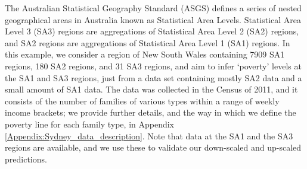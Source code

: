 \documentclass[nojss]{jss}
\begin{document}



The Australian Statistical Geography Standard (ASGS) defines a series of nested geographical areas in Australia known as Statistical Area Levels. 
Statistical Area Level 3 (SA3) regions are aggregations of Statistical Area Level 2 (SA2) regions, and SA2 regions are aggregations of  Statistical Area Level 1 (SA1) regions. 
In this example, we consider a region of New South Wales containing 7909 SA1 regions, 180 SA2 regions, and 31 SA3 regions, and aim to infer `poverty' levels at the SA1 and SA3 regions, 
just from a data set containing mostly SA2 data and a small amount of SA1 data. 
The data was collected in the Census of 2011, and it consists of the number of families of various types within a range of weekly income brackets; we provide further details, and the way in which we define the poverty line for each family type, in Appendix \ref{Appendix:Sydney_data_description}. 
Note that data at the SA1 and the SA3 regions are available, and we use these to validate our down-scaled and up-scaled predictions.  
\end{document}
